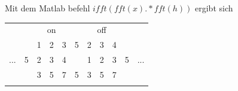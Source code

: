 Mit dem Matlab befehl $ifft(fft(x).*fft(h))$ ergibt sich
\begin{table}[H]
	\begin{tabular}{lllllllllll}
		& \multicolumn{1}{l|}{}  & \multicolumn{3}{c|}{on}                                                           & \multicolumn{1}{l|}{}     & \multicolumn{3}{c|}{off}       &   &     \\ \cline{3-9}
		& \multicolumn{1}{l|}{}  & 1                         & 2                         & 3                         & 5                         & 2 & 3 & \multicolumn{1}{l|}{4} &   &     \\
		... & \multicolumn{1}{l|}{5} & 2                         & 3                         & 4                         &                           & 1 & 2 & \multicolumn{1}{l|}{3} & 5 & ... \\ \cline{3-9}
		& \multicolumn{1}{l|}{}  & \cellcolor[HTML]{67FD9A}3 & \cellcolor[HTML]{67FD9A}5 & \cellcolor[HTML]{67FD9A}7 & \cellcolor[HTML]{67FD9A}5 & 3 & 5 & \multicolumn{1}{l|}{7} &   &     \\
		&                        &                           &                           &                           &                           &   &   &                        &   &    
	\end{tabular}
\end{table}
